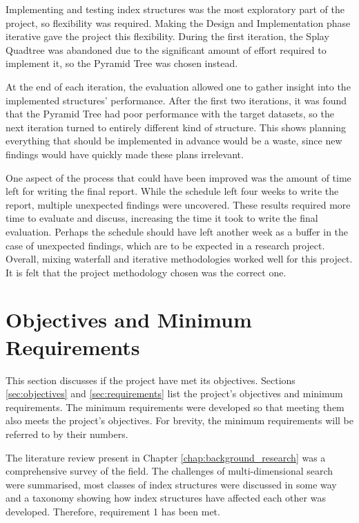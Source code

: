 Implementing and testing index structures was the most exploratory part of the project, so flexibility was required. Making the Design and Implementation phase iterative gave the project this flexibility. During the first iteration, the Splay Quadtree was abandoned due to the significant amount of effort required to implement it, so the Pyramid Tree was chosen instead.

At the end of each iteration, the evaluation allowed one to gather insight into the implemented structures' performance.  After the first two iterations, it was found that the Pyramid Tree had poor performance with the target datasets, so the next iteration turned to entirely different kind of structure. This shows planning everything that should be implemented in advance would be a waste, since new findings would have quickly made these plans irrelevant.

One aspect of the process that could have been improved was the amount of time left for writing the final report. While the schedule left four weeks to write the report, multiple unexpected findings were uncovered. These results required more time to evaluate and discuss, increasing the time it took to write the final evaluation. Perhaps the schedule should have left another week as a buffer in the case of unexpected findings, which are to be expected in a research project. Overall, mixing waterfall and iterative methodologies worked well for this project. It is felt that the project methodology chosen was the correct one.

\section{Objectives and Minimum Requirements}

This section discusses if the project have met its objectives. Sections \ref{sec:objectives} and \ref{sec:requirements} list the project's objectives and minimum requirements. The minimum requirements were developed so that meeting them also meets the project's objectives. For brevity, the minimum requirements will be referred to by their numbers.

The literature review present in Chapter \ref{chap:background_research} was a comprehensive survey of the field. The challenges of multi-dimensional search were summarised, most classes of index structures were discussed in some way and a taxonomy showing how index structures have affected each other was developed. Therefore, requirement 1 has been met.

